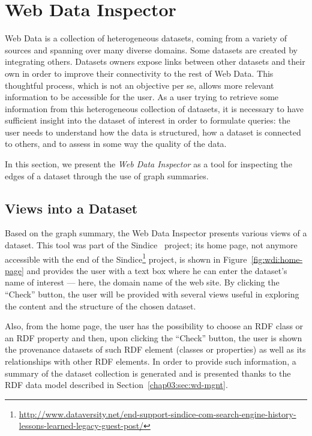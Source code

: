 \section{Web Data Inspector}
\label{sec:web-data-inspector}

Web Data is a collection of heterogeneous datasets, coming from a variety of sources and spanning over many diverse domains. Some datasets are created by integrating others. Datasets owners  expose links between other datasets and their own in order to improve their connectivity to the rest of Web Data. This thoughtful process, which is not an objective per se, allows more relevant information to be accessible for the user. As a user trying to retrieve some information from this heterogeneous collection of datasets, it is necessary to have sufficient insight into the dataset of interest in order to formulate queries: the user needs to understand how the data is structured, how a dataset is connected to others, and to assess in some way the quality of the data.

In this section, we present the \emph{Web Data Inspector} as a tool for inspecting the edges of a dataset through the use of graph summaries.

\subsection{Views into a Dataset}

Based on the graph summary, the Web Data Inspector presents various views of a dataset. This tool was part of the Sindice~\cite{oren:2008:sdl} project; its home page, not anymore accessible with the end of the Sindice\footnote{\url{http://www.dataversity.net/end-support-sindice-com-search-engine-history-lessons-learned-legacy-guest-post/}} project, is shown in Figure~\ref{fig:wdi:home-page} and provides the user with a text box where he can enter the dataset's name of interest --- here, the domain name of the web site. By clicking the ``Check'' button, the user will be provided with several views useful in exploring the content and the structure of the chosen dataset.

Also, from the home page, the user has the possibility to choose an RDF class or an RDF property and then, upon clicking the ``Check'' button, the user is shown the provenance datasets of such RDF element (classes or properties) as well as its relationships with other RDF elements. In order to provide such information, a summary of the dataset collection is generated and is presented thanks to the RDF data model described in Section~\ref{chap03:sec:wd-mgnt}.

